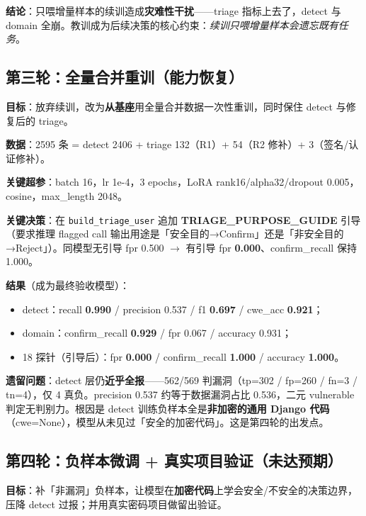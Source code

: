 \documentclass[UTF8,11pt]{ctexart}
\begin{document}
\textbf{结论}：只喂增量样本的续训造成\textbf{灾难性干扰}——triage 指标上去了，detect 与 domain 全崩。教训成为后续决策的核心约束：\textit{续训只喂增量样本会遗忘既有任务}。

\subsection{第三轮：全量合并重训（能力恢复）}

\textbf{目标}：放弃续训，改为\textbf{从基座}用全量合并数据一次性重训，同时保住 detect 与修复后的 triage。

\textbf{数据}：2595 条 = detect 2406 + triage 132（R1）+ 54（R2 修补）+ 3（签名/认证修补）。

\textbf{关键超参}：batch 16，lr 1e-4，3 epochs，LoRA rank16/alpha32/dropout 0.005，cosine，max\_length 2048。

\textbf{关键决策}：在 \texttt{build\_triage\_user} 追加 \textbf{TRIAGE\_PURPOSE\_GUIDE} 引导（要求推理 flagged call 输出用途是「安全目的→Confirm」还是「非安全目的→Reject」）。同模型无引导 fpr 0.500 $\rightarrow$ 有引导 fpr \textbf{0.000}、confirm\_recall 保持 1.000。

\textbf{结果}（成为最终验收模型）：

\begin{itemize}
  \item detect：recall \textbf{0.990} / precision 0.537 / f1 \textbf{0.697} / cwe\_acc \textbf{0.921}；
  \item domain：confirm\_recall \textbf{0.929} / fpr 0.067 / accuracy 0.931；
  \item 18 探针（引导后）：fpr \textbf{0.000} / confirm\_recall \textbf{1.000} / accuracy \textbf{1.000}。
\end{itemize}

\textbf{遗留问题}：detect 层仍\textbf{近乎全报}——562/569 判漏洞（tp=302 / fp=260 / fn=3 / tn=4），仅 4 真负。precision 0.537 约等于数据漏洞占比 0.536，二元 vulnerable 判定无判别力。根因是 detect 训练负样本全是\textbf{非加密的通用 Django 代码}（cwe=None），模型从未见过「安全的加密代码」。这是第四轮的出发点。

\subsection{第四轮：负样本微调 + 真实项目验证（未达预期）}

\textbf{目标}：补「非漏洞」负样本，让模型在\textbf{加密代码}上学会安全/不安全的决策边界，压降 detect 过报；并用真实密码项目做留出验证。
\end{document}
